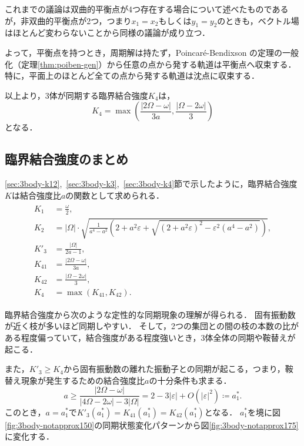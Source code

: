 \documentclass[../main]{subfiles}
\begin{document}
    これまでの議論は双曲的平衡点が4つ存在する場合について述べたものであるが，非双曲的平衡点が2つ，つまり$x_1=x_2$もしくは$y_1=y_2$のときも，ベクトル場はほとんど変わらないことから同様の議論が成り立つ．

    よって，平衡点を持つとき，周期解は持たず，Poincar\'{e}-Bendixson の定理の一般化（定理\ref{thm:poiben-gen}）から任意の点から発する軌道は平衡点へ収束する．
    特に，平面上のほとんど全ての点から発する軌道は沈点に収束する．

    以上より，3体が同期する臨界結合強度$K_4$は，
    \begin{equation}
        \label{eq:K4-approx}
        K_4=\max\left(\frac{|2\Omega-\omega|}{3a},\frac{|\Omega-2\omega|}{3}\right)
    \end{equation}
    となる．
    
    \subsection{臨界結合強度のまとめ}
    \label{sec:3body-summary}
    \ref{sec:3body-k12},\ \ref{sec:3body-k3},\ \ref{sec:3body-k4}節で示したように，臨界結合強度$K$は結合強度比$a$の関数として求められる．
    \begin{align}
        \label{eq:3body-matome}
        \begin{split}
            K_1&=\frac{\omega}{2},\\
            K_2&=|\Omega|\cdot\sqrt{\frac{1}{a^4-a^2}\left(2+a^2\varepsilon+\sqrt{(2+a^2\varepsilon)^2-\varepsilon^2(a^4-a^2)}\right)},\\
            K'_3&=\frac{|\Omega|}{2a-1},\\
            K_{41}&=\frac{|2\Omega-\omega|}{3a},\\
            K_{42}&=\frac{|\Omega-2\omega|}{3},\\
            K_4&=\max\left(K_{41},K_{42}\right).
        \end{split}
    \end{align}

    臨界結合強度から次のような定性的な同期現象の理解が得られる．
    固有振動数が近く枝が多いほど同期しやすい．
    そして，2つの集団との間の枝の本数の比がある程度偏っていて，結合強度がある程度強いとき，3体全体の同期や鞍替えが起こる．
    
    また，$K'_3\geq K_4$から固有振動数の離れた振動子との同期が起こる，つまり，鞍替え現象が発生するための結合強度比$a$の十分条件も求まる．
    \begin{equation}
        \label{eq:a-ast1}
        a\geq \frac{|2\Omega-\omega|}{|4\Omega-2\omega|-3|\Omega|}= 2-3|\varepsilon|+O(|\varepsilon|^2)\coloneqq a^\ast_1.    
    \end{equation}
    このとき，$a=a^\ast_1$で$K'_{3}(a^\ast_1)=K_{41}(a^\ast_1)=K_{42}(a^\ast_1)$となる．
    $a^\ast_1$を境に図\ref{fig:3body-notapprox150}の同期状態変化パターンから図\ref{fig:3body-notapprox175}に変化する．
\end{document}
